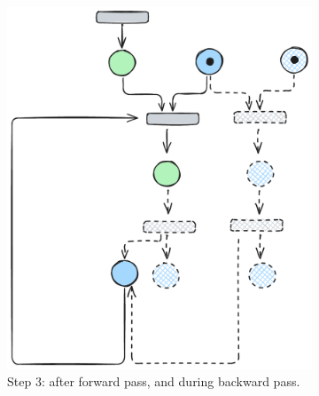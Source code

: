 \begin{figure}[htbp]
	
	\vspace{1em}
	
	\begin{subfigure}[b]{0.30\textwidth}
		\centering
		\includegraphics[width=\textwidth]{plots/bidirectional_pruning_step_c_backward.pdf}
		\caption{Step 3: after forward pass, and during backward pass.}\label{fig:step:c}
	\end{subfigure}\hfill
	\begin{subfigure}[b]{0.23\textwidth}
		\centering

\end{subfigure}
\end{figure}
